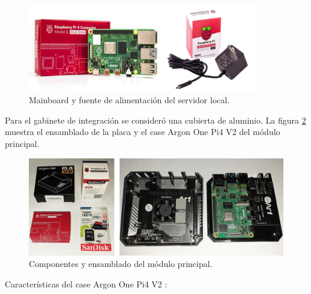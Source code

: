 \begin{figure}[htpb]
\centering 
\includegraphics[width=0.9\textwidth]{./Figures/placa.png}
\caption{Mainboard y fuente de alimentación del servidor local.}
\label{fig:placarpi4}
\end{figure}
Para el gabinete de integración se consideró una cubierta de aluminio. La figura \ref{fig:armado} muestra el ensamblado de la placa y el case Argon One Pi4 V2 del módulo principal.

\begin{figure}[htpb]
\centering 
\includegraphics[width=1.0\textwidth]{./Figures/m1-2.jpg}
\caption{Componentes y ensamblado del módulo principal.}
\label{fig:armado}
\end{figure}

\vspace{0.5cm}
Características del case Argon One Pi4 V2 \citep{WEBSITE:16}:

